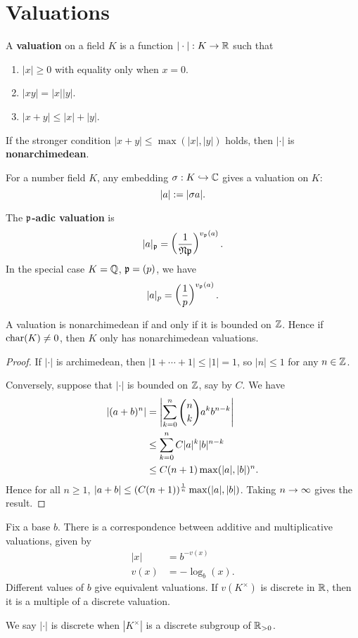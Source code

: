 \section{Valuations}
\begin{df}
A \textbf{valuation} on a field $K$ is a function $|\cdot |:K\to \mathbb{R}$ such that
\begin{enumerate}
\item
$|x|\ge 0$ with equality only when $x=0$.
\item
$|xy|=|x||y|$.
\item
$|x+y|\le |x|+|y|$.
\end{enumerate}
If the stronger condition $|x+y|\le \max(|x|,|y|)$ holds, then $|\cdot|$ is \textbf{nonarchimedean}.
\end{df}
\begin{ex}
For a number field $K$, any embedding $\sigma:K\hookrightarrow \mathbb{C}$ gives a valuation on $K$:
\[|a|:=|\sigma a|.\]
\end{ex}
\begin{ex}
The \textbf{$\mathfrak{p}$-adic valuation} is
\[
|a|_{\mathfrak{p}}=\left( {\frac{1}{\mathfrak N \mathfrak{p}}} \right)^{v_{\mathfrak{p}}(a)}.
\]
In the special case $K=\mathbb{Q}$, $\mathfrak{p}=(p)$, we have
\[
|a|_p=\left( {\frac{1}{p}} \right)^{v_{\mathfrak{p}}(a)}.
\]
\end{ex}
\begin{pr}
A valuation is nonarchimedean if and only if it is bounded on $\mathbb{Z}$. Hence if $\operatorname{char}(K)\ne 0$, then $K$ only has nonarchimedean valuations.
\end{pr}
\begin{proof}
If $|\cdot|$ is archimedean, then $|1+\cdots +1|\le |1|=1$, so $|n|\le 1$ for any $n\in \mathbb{Z}$.

Conversely, suppose that $|\cdot |$ is bounded on $\mathbb{Z}$, say by $C$. We have
\begin{align*}
|(a+b)^n|&=\left| {\sum_{k=0}^n \binom nk a^kb^{n-k}} \right|\\
&\le \sum_{k=0}^n C |a|^k|b|^{n-k}\\
&\le C(n+1)\max(|a|,|b|)^n.
\end{align*}
Hence for all $n\ge 1$, $|a+b|\le (C(n+1))^{\frac{1}{n}}\max(|a|,|b|)$. Taking $n\to \infty$ gives the result.
\end{proof}
\begin{pr}
Fix a base $b$. There is a correspondence between additive and multiplicative valuations, given by
\begin{align*}
|x|&=b^{-v(x)}\\
v(x)&=-\log_b(x).
\end{align*}
Different values of $b$ give equivalent valuations. If $v(K^{\times})$ is discrete in $\mathbb{R}$, then it is a multiple of a discrete valuation.
\end{pr}
We say $|\cdot|$ is discrete when $|K^{\times}|$ is a discrete subgroup of $\mathbb{R}_{>0}$.


